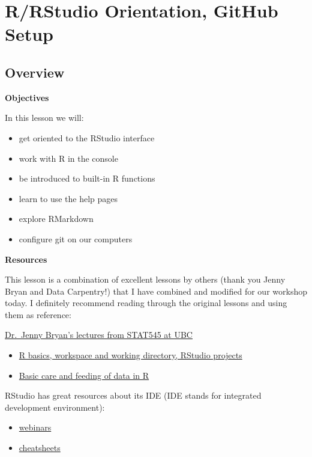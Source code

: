 \documentclass[]{book}
\providecommand{\tightlist}{%
  \setlength{\itemsep}{0pt}\setlength{\parskip}{0pt}}
\theoremstyle{definition}
\theoremstyle{definition}
\theoremstyle{definition}
\theoremstyle{remark}
\begin{document}
\hypertarget{rstudio}{\chapter{R/RStudio Orientation, GitHub
Setup}\label{rstudio}}

\hypertarget{overview}{\section{Overview}\label{overview}}

\textbf{Objectives}

In this lesson we will:

\begin{itemize}
\tightlist
\item
  get oriented to the RStudio interface
\item
  work with R in the console
\item
  be introduced to built-in R functions
\item
  learn to use the help pages
\item
  explore RMarkdown
\item
  configure git on our computers
\end{itemize}

\textbf{Resources}

This lesson is a combination of excellent lessons by others (thank you
Jenny Bryan and Data Carpentry!) that I have combined and modified for
our workshop today. I definitely recommend reading through the original
lessons and using them as reference:

\href{https://stat545-ubc.github.io/}{Dr.~Jenny Bryan's lectures from
STAT545 at UBC}

\begin{itemize}
\tightlist
\item
  \href{http://stat545-ubc.github.io/block002_hello-r-workspace-wd-project.html}{R
  basics, workspace and working directory, RStudio projects}
\item
  \href{http://stat545-ubc.github.io/block006_care-feeding-data.html}{Basic
  care and feeding of data in R}
\end{itemize}

RStudio has great resources about its IDE (IDE stands for integrated
development environment):

\begin{itemize}
\tightlist
\item
  \href{https://www.rstudio.com/resources/webinars/}{webinars}
\item
  \href{https://www.rstudio.com/resources/cheatsheets/}{cheatsheets}
\end{itemize}
\end{document}
